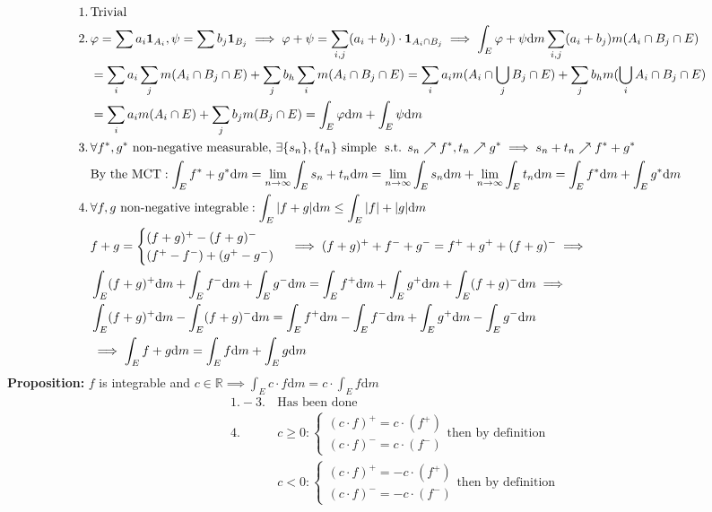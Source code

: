 \documentclass{article}
\newcommand{\R}{\mathbb{R}}
\newcommand{\limninf}{\displaystyle\lim_{n\to\infty}}
\newcommand{\st}{\mbox{ s.t. }}
\newcommand{\0}{{\bf{0}}}
\newcommand{\1}{{\bf{1}}}
\newcommand{\dint}{\displaystyle\int}
\newcommand{\dif}{\mbox{d}}
\newcommand{\incto}{\nearrow}
\begin{document}
\begin{equation}
\begin{split}
    1.\,&\mbox{Trivial}\\
    2.\,&\varphi=\sum a_i\1_{A_i},\psi=\sum b_j\1_{B_j}\implies\varphi+\psi=\sum_{i,j}(a_i+b_j)\cdot\1_{A_i\cap B_j}\implies\int_E\varphi+\psi\dif m\sum_{i,j}(a_i+b_j)m(A_i\cap B_j\cap E)\\
    &=\sum_ia_i\sum_jm(A_i\cap B_j\cap E)+\sum_jb_h\sum_im(A_i\cap B_j\cap E)=\sum_ia_im(A_i\cap\bigcup_jB_j\cap E)+\sum_jb_hm(\bigcup_iA_i\cap B_j\cap E)\\
    &=\sum_ia_im(A_i\cap E)+\sum_jb_jm(B_j\cap E)=\int_E\varphi\dif m+\int_E\psi\dif m\\
    3.\,&\forall f^*,g^*\mbox{ non-negative measurable, }\exists\{s_n\},\{t_n\}\mbox{ simple }\st s_n\incto f^*,t_n\incto g^*\implies s_n+t_n\incto f^*+g^*\\
    &\mbox{By the MCT}:\int_E f^*+g^*\dif m=\limninf\int_Es_n+t_n\dif m=\limninf\int_Es_n\dif m+\limninf\int_Et_n\dif m=\int_Ef^*\dif m+\int_Eg^*\dif m\\
    4.\,&\forall f,g\mbox{ non-negative integrable}:\int_E|f+g|\dif m\le\int_E|f|+|g|\dif m\\
    &f+g=\begin{cases}
        (f+g)^+-(f+g)^-\\
        (f^+-f^-)+(g^+-g^-)
    \end{cases}\implies(f+g)^++f^-+g^-=f^++g^++(f+g)^-\implies\\
    &\int_E(f+g)^+\dif m+\int_E f^-\dif m+\int_Eg^-\dif m=\int_Ef^+\dif m+\int_Eg^+\dif m+\int_E(f+g)^-\dif m\implies\\
    &\int_E(f+g)^+\dif m-\int_E(f+g)^-\dif m=\int_Ef^+\dif m-\int_Ef^-\dif m+\int_Eg^+\dif m-\int_Eg^-\dif m\\
    &\implies\int_Ef+g\dif m=\int_Ef\dif m+\int_Eg\dif m\\
\end{split}
\end{equation}
\textbf{Proposition:} $f$ is integrable and $c\in\R\implies\dint_Ec\cdot f\dif m=c\cdot\dint_Ef\dif m$
\begin{equation}
\begin{split}
    1.-3.\,&\mbox{Has been done}\\
    4.\,&c\geq0:\begin{cases}
        (c\cdot f)^+=c\cdot(f^+)\\
        (c\cdot f)^-=c\cdot(f^-)
    \end{cases}\mbox{then by definition}\\
    &c<0:\begin{cases}
        (c\cdot f)^+=-c\cdot(f^+)\\
        (c\cdot f)^-=-c\cdot(f^-)
    \end{cases}\mbox{then by definition}
\end{split}
\end{equation}
\end{document}
